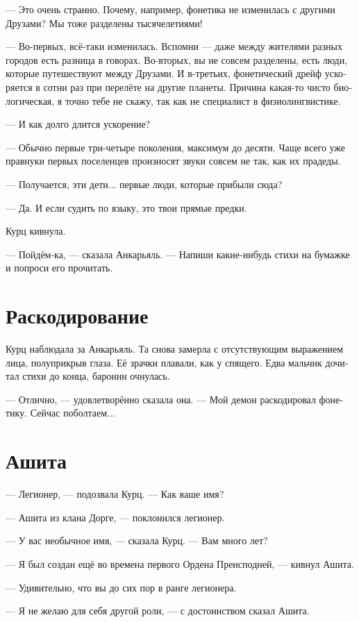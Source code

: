 \documentclass[a4paper,10pt,fleqn]{book}\usepackage{polyglossia}\setdefaultlanguage[babelshorthands=true]{russian}\setotherlanguage{english}\defaultfontfeatures{Ligatures=TeX,Mapping=tex-text}\usepackage{xcolor}\newcommand{\ml}[3]{#2}
\begin{document}
--- Это очень странно.
Почему, например, фонетика не изменилась с другими Друзами?
Мы тоже разделены тысячелетиями!

--- Во-первых, всё-таки изменилась.
Вспомни --- даже между жителями разных городов есть разница в говорах.
Во-вторых, вы не совсем разделены, есть люди, которые путешествуют между Друзами.
И в-третьих, фонетический дрейф ускоряется в сотни раз при перелёте на другие планеты.
Причина какая-то чисто биологическая, я точно тебе не скажу, так как не специалист в физиолингвистике.

--- И как долго длится ускорение?

--- Обычно первые три-четыре поколения, максимум до десяти.
Чаще всего уже правнуки первых поселенцев произносят звуки совсем не так, как их прадеды.

--- Получается, эти дети... первые люди, которые прибыли сюда?

--- Да.
И если судить по языку, это твои прямые предки.

Курц кивнула.

--- Пойдём-ка, --- сказала Анкарьяль.
--- Напиши какие-нибудь стихи на бумажке и попроси его прочитать.

\section{Раскодирование}

Курц наблюдала за Анкарьяль.
Та снова замерла с отсутствующим выражением лица, полуприкрыв глаза.
Её зрачки плавали, как у спящего.
Едва мальчик дочитал стихи до конца, баронин очнулась.

--- Отлично, --- удовлетворённо сказала она.
--- Мой демон раскодировал фонетику.
Сейчас поболтаем...

\section{Ашита}

--- Легионер, --- подозвала Курц.
--- Как ваше имя?

--- Ашита из клана Дорге, --- поклонился легионер.

--- У вас необычное имя, --- сказала Курц.
--- Вам много лет?

--- Я был создан ещё во времена первого Ордена Преисподней, --- кивнул Ашита.

--- Удивительно, что вы до сих пор в ранге легионера.

--- Я не желаю для себя другой роли, --- с достоинством сказал Ашита.
\end{document}
